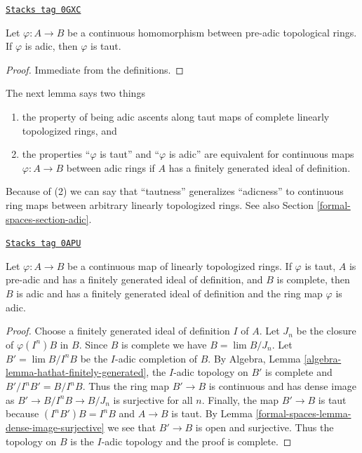 \begin{lemma}
\label{formal-spaces-lemma-adic-taut}
\href{https://stacks.math.columbia.edu/tag/0GXC}{\texttt{Stacks tag 0GXC}}

Let $\varphi : A \to B$ be a continuous homomorphism between
pre-adic topological rings. If $\varphi$ is adic, then $\varphi$ is taut.
\end{lemma}

\begin{proof}
Immediate from the definitions.
\end{proof}

The next lemma says two things
\begin{enumerate}
\item the property of being adic ascents along taut maps
of complete linearly topologized rings, and
\item the properties ``$\varphi$ is taut'' and ``$\varphi$ is adic''
are equivalent for continuous maps $\varphi : A \to B$ between adic rings
if $A$ has a finitely generated ideal of definition.
\end{enumerate}
Because of (2) we can say that ``tautness'' generalizes ``adicness''
to continuous ring maps between arbitrary linearly topologized rings.
See also Section \ref{formal-spaces-section-adic}.

\begin{lemma}
\label{formal-spaces-lemma-taut-is-adic}
\href{https://stacks.math.columbia.edu/tag/0APU}{\texttt{Stacks tag 0APU}}

Let $\varphi : A \to B$ be a continuous map of linearly topologized rings.
If $\varphi$ is taut, $A$ is pre-adic and has a finitely generated ideal
of definition, and $B$ is complete, then $B$ is adic and has a finitely
generated ideal of definition and the ring map $\varphi$ is adic.
\end{lemma}

\begin{proof}
Choose a finitely generated ideal of definition $I$ of $A$.
Let $J_n$ be the closure of $\varphi(I^n)B$ in $B$.
Since $B$ is complete we have $B = \lim B/J_n$.
Let $B' = \lim B/I^nB$ be the $I$-adic completion of $B$.
By Algebra, Lemma \ref{algebra-lemma-hathat-finitely-generated},
the $I$-adic topology on $B'$ is complete and
$B'/I^nB' = B/I^nB$. Thus the ring map $B' \to B$ is continuous
and has dense image as $B' \to B/I^nB \to B/J_n$ is surjective
for all $n$. Finally, the map $B' \to B$ is taut
because $(I^nB')B = I^nB$ and $A \to B$ is taut.
By Lemma \ref{formal-spaces-lemma-dense-image-surjective} we see that $B' \to B$ is open
and surjective. Thus the topology on $B$ is the $I$-adic topology
and the proof is complete.
\end{proof}


